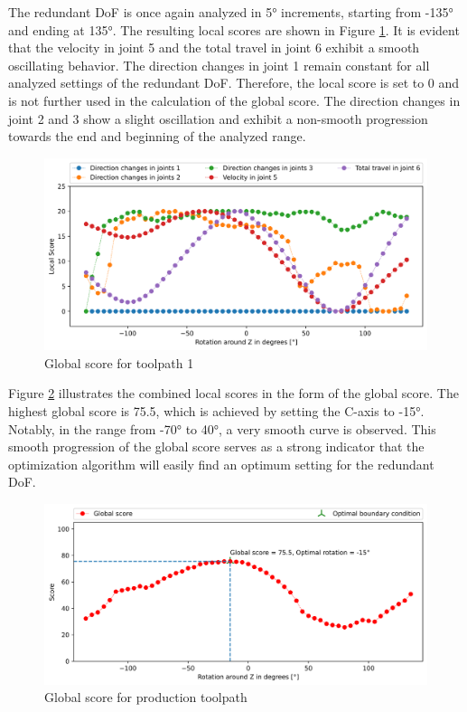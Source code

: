 The redundant \acrshort{DoF} is once again analyzed in 5° increments, starting from -135° and ending at 135°. The resulting local scores are shown in Figure \ref{LS4}. It is evident that the velocity in joint 5 and the total travel in joint 6 exhibit a smooth oscillating behavior. The direction changes in joint 1 remain constant for all analyzed settings of the redundant \acrshort{DoF}. Therefore, the local score is set to 0 and is not further used in the calculation of the global score. The direction changes in joint 2 and 3 show a slight oscillation and exhibit a non-smooth progression towards the end and beginning of the analyzed range.

\begin{figure}[H]
	\centerline{\includegraphics[width=1\textwidth]{figures/LocalScores_4.png}}
	\caption{Global score for toolpath 1}
	\label{LS4}
\end{figure}

Figure \ref{GS4} illustrates the combined local scores in the form of the global score. The highest global score is 75.5, which is achieved by setting the C-axis to -15°. Notably, in the range from -70° to 40°, a very smooth curve is observed. This smooth progression of the global score serves as a strong indicator that the optimization algorithm will easily find an optimum setting for the redundant \acrshort{DoF}.

\begin{figure}[H]
	\centerline{\includegraphics[width=1\textwidth]{figures/best_c_4.png}}
	\caption{Global score for production toolpath}
	\label{GS4}
\end{figure}



